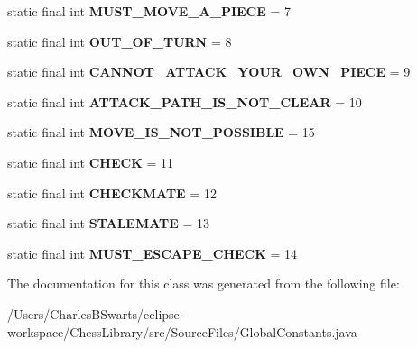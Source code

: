 \begin{DoxyCompactItemize}
static final int {\bfseries M\+U\+S\+T\+\_\+\+M\+O\+V\+E\+\_\+\+A\+\_\+\+P\+I\+E\+CE} = 7
\item 
\mbox{\label{class_source_files_1_1_global_constants_a9ef9278453eb61547d5986c056eb77d2}} 
static final int {\bfseries O\+U\+T\+\_\+\+O\+F\+\_\+\+T\+U\+RN} = 8
\item 
\mbox{\label{class_source_files_1_1_global_constants_aac542b6414d8eac71faaf819bfa2280d}} 
static final int {\bfseries C\+A\+N\+N\+O\+T\+\_\+\+A\+T\+T\+A\+C\+K\+\_\+\+Y\+O\+U\+R\+\_\+\+O\+W\+N\+\_\+\+P\+I\+E\+CE} = 9
\item 
\mbox{\label{class_source_files_1_1_global_constants_a61c6486b826536ce41427a11dbeb1d1d}} 
static final int {\bfseries A\+T\+T\+A\+C\+K\+\_\+\+P\+A\+T\+H\+\_\+\+I\+S\+\_\+\+N\+O\+T\+\_\+\+C\+L\+E\+AR} = 10
\item 
\mbox{\label{class_source_files_1_1_global_constants_a45eb62b489a8eb28e2b80ef91059d15c}} 
static final int {\bfseries M\+O\+V\+E\+\_\+\+I\+S\+\_\+\+N\+O\+T\+\_\+\+P\+O\+S\+S\+I\+B\+LE} = 15
\item 
\mbox{\label{class_source_files_1_1_global_constants_adacc7da311b47ca668e788ac55dff028}} 
static final int {\bfseries C\+H\+E\+CK} = 11
\item 
\mbox{\label{class_source_files_1_1_global_constants_ae772ac01db3f38b565b54721b0070220}} 
static final int {\bfseries C\+H\+E\+C\+K\+M\+A\+TE} = 12
\item 
\mbox{\label{class_source_files_1_1_global_constants_a49cd457881034d16fd1c6312447a6a90}} 
static final int {\bfseries S\+T\+A\+L\+E\+M\+A\+TE} = 13
\item 
\mbox{\label{class_source_files_1_1_global_constants_a9ea2080c41421e9bf741935a5b8660b3}} 
static final int {\bfseries M\+U\+S\+T\+\_\+\+E\+S\+C\+A\+P\+E\+\_\+\+C\+H\+E\+CK} = 14
\end{DoxyCompactItemize}


The documentation for this class was generated from the following file\+:\begin{DoxyCompactItemize}
\item 
/\+Users/\+Charles\+B\+Swarts/eclipse-\/workspace/\+Chess\+Library/src/\+Source\+Files/Global\+Constants.\+java\end{DoxyCompactItemize}
